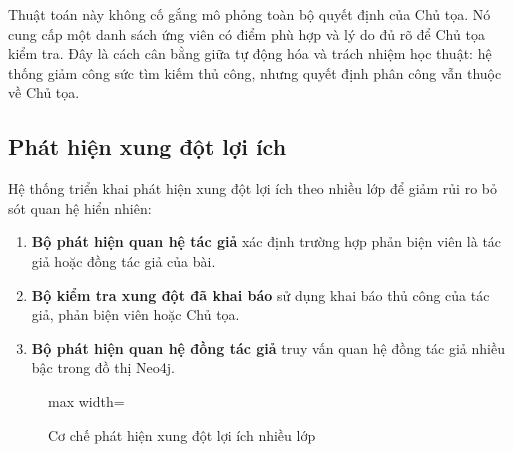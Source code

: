 Thuật toán này không cố gắng mô phỏng toàn bộ quyết định của Chủ tọa. Nó cung cấp một danh sách ứng viên có điểm phù hợp và lý do đủ rõ để Chủ tọa kiểm tra. Đây là cách cân bằng giữa tự động hóa và trách nhiệm học thuật: hệ thống giảm công sức tìm kiếm thủ công, nhưng quyết định phân công vẫn thuộc về Chủ tọa.

\subsection{Phát hiện xung đột lợi ích}

Hệ thống triển khai phát hiện xung đột lợi ích theo nhiều lớp để giảm rủi ro bỏ sót quan hệ hiển nhiên:

\begin{enumerate}
  \item \textbf{Bộ phát hiện quan hệ tác giả} xác định trường hợp phản biện viên là tác giả hoặc đồng tác giả của bài.
  \item \textbf{Bộ kiểm tra xung đột đã khai báo} sử dụng khai báo thủ công của tác giả, phản biện viên hoặc Chủ tọa.
  \item \textbf{Bộ phát hiện quan hệ đồng tác giả} truy vấn quan hệ đồng tác giả nhiều bậc trong đồ thị Neo4j.
\end{enumerate}

\begin{figure}[H]
  \centering
  \begin{adjustbox}{max width=\textwidth}
  \end{adjustbox}
  \caption{Cơ chế phát hiện xung đột lợi ích nhiều lớp}
  \label{fig:ch3-23}
\end{figure}

